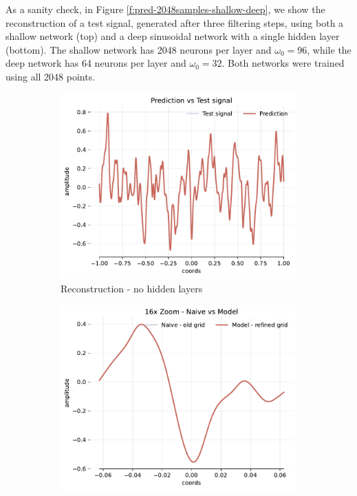 As a sanity check, in Figure \ref{f:pred-2048samples-shallow-deep}, we show the reconstruction of a test signal, generated after three filtering steps, using both a shallow network (top) and a deep sinusoidal network with a single hidden layer (bottom). The shallow network has 2048 neurons per layer and \(\omega_0 = 96\), while the deep network has 64 neurons per layer and \(\omega_0 = 32\). Both networks were trained using all 2048 points. 

\begin{figure}[!h]
    \centering
    \begin{subfigure}[b]{0.32\textwidth}
        \centering
        \includegraphics[width=\textwidth]{img/ch3/pred-2048hf-0hl-96w-filter3.pdf}
        \caption{Reconstruction - no hidden layers}
    \end{subfigure}
    \begin{subfigure}[b]{0.32\textwidth}
        \centering
        \includegraphics[width=\textwidth]{img/ch3/16x-2048hf-0hl-96w-filter3.pdf}

\end{subfigure}
\end{figure}
